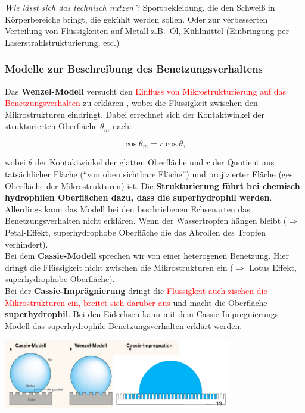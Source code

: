 \textit{Wie lässt sich das technisch nutzen} \dangersign? Sportbekleidung, die den Schweiß in Körperbereiche bringt, die gekühlt werden sollen. Oder zur verbesserten Verteilung von Flüssigkeiten auf Metall z.B.\ Öl, Kühlmittel (Einbringung per Laserstrahlstrukturierung, etc.) 

\subsubsection{Modelle zur Beschreibung des Benetzungsverhaltens}

Das \textbf{Wenzel-Modell} versucht den \textcolor{red}{Einfluss von Mikrostrukturierung auf das Benetzungsverhalten} zu erklären \dangersign, wobei die Flüssigkeit zwischen den Mikrostrukturen eindringt. Dabei errechnet sich der Kontaktwinkel der strukturierten Oberfläche $\theta_m$ nach:

$$\cos \theta_m = r \cos \theta,$$

wobei $\theta$ der Kontaktwinkel der glatten Oberfläche und $r$ der Quotient aus tatsächlicher Fläche (``von oben sichtbare Fläche'') und projizierter Fläche (ges. Oberfläche der Mikrostrukturen) ist. Die \textbf{Strukturierung führt bei chemisch hydrophilen Oberflächen dazu, dass die superhydrophil werden}. Allerdings kann das Modell bei den beschriebenen Echsenarten das Benetzungsverhalten nicht erklären. Wenn der Wassertropfen hängen bleibt ($\Longrightarrow$ Petal-Effekt, superhydrophobe Oberfläche die das Abrollen des Tropfen verhindert).\\

Bei dem \textbf{Cassie-Modell} sprechen wir von einer heterogenen Benetzung. Hier dringt die Flüssigkeit nicht zwischen die Mikrostrukturen ein ($\Longrightarrow$ Lotus Effekt, superhydrophobe Oberfläche).\\

Bei der \textbf{Cassie-Imprägnierung} dringt die \textcolor{red}{Flüssigkeit auch zischen die Mikrostrukturen ein, breitet sich darüber aus} \dangersign und macht die Oberfläche \textbf{superhydrophil}. Bei den Eidechsen kann mit dem Cassie-Impregnierungs-Modell das superhydrophile Benetzungsverhalten erklärt werden.

\begin{center}
    \includegraphics[width=10cm]{lec3/figures/wenzel_cassie.png}
\end{center}

